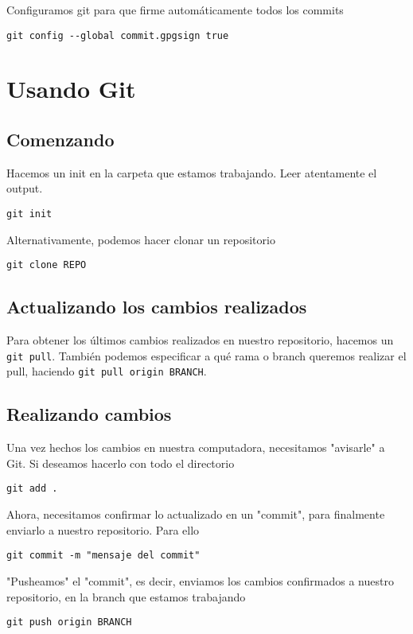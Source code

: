 \documentclass[11pt]{article}
\begin{document}
Configuramos git para que firme automáticamente todos los commits
\begin{verbatim}
git config --global commit.gpgsign true
\end{verbatim}

\section{Usando Git}
\label{sec:orgbe6762b}

\subsection{Comenzando}
\label{sec:org2f7906f}

Hacemos un init en la carpeta que estamos trabajando. Leer atentamente
el output.
\begin{verbatim}
git init
\end{verbatim}

Alternativamente, podemos hacer clonar un repositorio
\begin{verbatim}
git clone REPO
\end{verbatim}

\subsection{Actualizando los cambios realizados}
\label{sec:orgacf4a31}

Para obtener los últimos cambios realizados en nuestro repositorio,
hacemos un \texttt{git pull}. También podemos especificar a qué rama o branch
queremos realizar el pull, haciendo \texttt{git pull origin BRANCH}.

\subsection{Realizando cambios}
\label{sec:orgf36b9f8}

Una vez hechos los cambios en nuestra computadora, necesitamos
"avisarle" a Git. Si deseamos hacerlo con todo el directorio
\begin{verbatim}
git add .
\end{verbatim}

Ahora, necesitamos confirmar lo actualizado en un "commit", para
finalmente enviarlo a nuestro repositorio. Para ello
\begin{verbatim}
git commit -m "mensaje del commit"
\end{verbatim}

"Pusheamos" el "commit", es decir, enviamos los cambios confirmados a
nuestro repositorio, en la branch que estamos trabajando
\begin{verbatim}
git push origin BRANCH
\end{verbatim}
\end{document}
